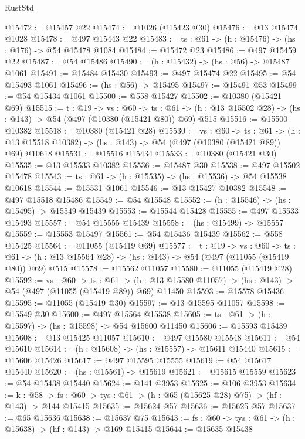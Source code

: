 \begin{lexlean}{RustStd}
\begin{coremodule}
@15472 := @15457 @22
@15474 := @1026 (@15423 @30)
@15476 := @13 @15474 @1028
@15478 := @497 @15443 @22
@15483 := {ts : @61} -> (h : @15476) -> (hs : @176) -> @54 @15478 @1084
@15484 := @15472 @23
@15486 := @497 @15459 @22
@15487 := @54 @15486
@15490 := (h : @15432) -> (hs : @56) -> @15487 @1061
@15491 := @15484 @15430
@15493 := @497 @15474 @22
@15495 := @54 @15493 @1061
@15496 := (hs : @56) -> @15495
@15497 := @15491 @53
@15499 := @54 @15434 @1061
@15500 := @558 @15427
@15502 := @10380 (@15421 @69)
@15515 := {t : @19} ->
  {vs : @60} ->
  {ts : @61} -> (h : @13 @15502 @28) -> (hs : @143) -> @54 (@497 (@10380 (@15421 @80)) @69) @515
@15516 := @15500 @10382
@15518 := @10380 (@15421 @28)
@15530 := {vs : @60} ->
  {ts : @61} ->
  (h : @13 @15518 @10382) -> (hs : @143) -> @54 (@497 (@10380 (@15421 @89)) @69) @10618
@15531 := @15516 @15434
@15533 := @10380 (@15421 @30)
@15535 := @13 @15533 @10382
@15536 := @15487 @30
@15538 := @497 @15502 @15478
@15543 := {ts : @61} -> (h : @15535) -> (hs : @15536) -> @54 @15538 @10618
@15544 := @15531 @1061
@15546 := @13 @15427 @10382
@15548 := @497 @15518 @15486
@15549 := @54 @15548
@15552 := (h : @15546) -> (hs : @15495) -> @15549 @15439
@15553 := @15544 @15428
@15555 := @497 @15533 @15493
@15557 := @54 @15555 @15439
@15558 := (hs : @15499) -> @15557
@15559 := @15553 @15497
@15561 := @54 @15436 @15439
@15562 := @558 @15425
@15564 := @11055 (@15419 @69)
@15577 := {t : @19} ->
  {vs : @60} ->
  {ts : @61} -> (h : @13 @15564 @28) -> (hs : @143) -> @54 (@497 (@11055 (@15419 @80)) @69) @515
@15578 := @15562 @11057
@15580 := @11055 (@15419 @28)
@15592 := {vs : @60} ->
  {ts : @61} ->
  (h : @13 @15580 @11057) -> (hs : @143) -> @54 (@497 (@11055 (@15419 @89)) @69) @11450
@15593 := @15578 @15436
@15595 := @11055 (@15419 @30)
@15597 := @13 @15595 @11057
@15598 := @15549 @30
@15600 := @497 @15564 @15538
@15605 := {ts : @61} -> (h : @15597) -> (hs : @15598) -> @54 @15600 @11450
@15606 := @15593 @15439
@15608 := @13 @15425 @11057
@15610 := @497 @15580 @15548
@15611 := @54 @15610
@15614 := (h : @15608) -> (hs : @15557) -> @15611 @15440
@15615 := @15606 @15426
@15617 := @497 @15595 @15555
@15619 := @54 @15617 @15440
@15620 := (hs : @15561) -> @15619
@15621 := @15615 @15559
@15623 := @54 @15438 @15440
@15624 := @141 @3953
@15625 := @106 @3953
@15634 := {k : @58} ->
  {fs : @60} -> {tys : @61} -> (h : @65 (@15625 @28) @75) -> (hf : @143) -> @144 @15415
@15635 := @15624 @57
@15636 := @15625 @57
@15637 := @65 @15636
@15638 := @15637 @75
@15643 := {fs : @60} -> {tys : @61} -> (h : @15638) -> (hf : @143) -> @169 @15415
@15644 := @15635 @15438

\end{coremodule}
\end{lexlean}

